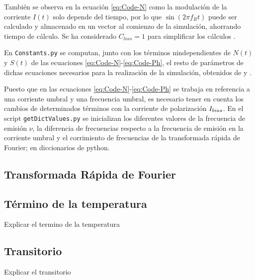 	Tambi\'en se observa en la ecuaci\'on \ref{eq:Code-N} como la modulaci\'on de la corriente $I(t)$ solo depende del tiempo, por lo que $\sin(2\pi f_R t)$ puede ser calculado y almacenado en un vector al comienzo de la simulaci\'on, ahorrando tiempo de c\'alculo. Se ha considerado $C_{loss} = 1$ para simplificar los c\'alculos \cite{Chaves19}.

	En \texttt{Constants.py} se computan, junto con los t\'erminos nindependientes de $N(t)$ y $S(t)$ de las ecuaciones \ref{eq:Code-N}-\ref{eq:Code-Ph}, el resto de par\'ametros de dichas ecuaciones necesarios para la realizaci\'on de la simulaci\'on, obtenidos de \cite{artSim} y \cite{Chaves19}.

	Puesto que en las ecuaciones \ref{eq:Code-N}-\ref{eq:Code-Ph} se trabaja en referencia a una corriente umbral y una frecuencia umbral, es necesario tener en cuenta los cambios de determinados t\'erminos con la corriente de polarización $I_{bias}$. En el script \texttt{getDictValues.py} se inicializan los diferentes valores de la frecuencia de emisión $\nu$, la diferencia de frecuencias respecto a la frecuencia de emisi\'on en la corriente umbral \cite{Chaves19} y el corrimiento de frecuencias de la transformada r\'apida de Fourier; en diccionarios de python.

	\subsection{Transformada R\'apida de Fourier}
		\label{Mdl:Code:Temp}

	\subsection{T\'ermino de la temperatura}
		\label{Mdl:Code:Temp}

		Explicar el termino de la temperatura

	\subsection{Transitorio}
		\label{Mdl:Code:Trans}

		Explicar el transitorio
